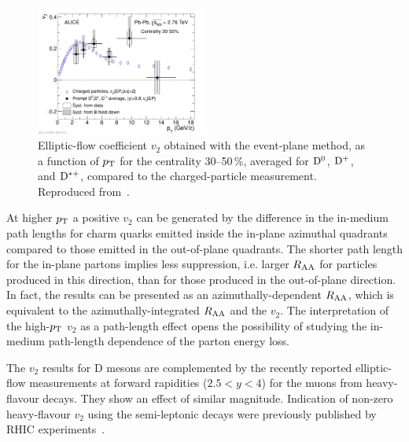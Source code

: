 \begin{figure}
\centering
\includegraphics[width=0.5\textwidth]{ksfigures/DmesonV2.pdf}
\caption{Elliptic-flow coefficient $v_2$ obtained with the event-plane method, as a function of $p_{\rm T}$ for the centrality 30--50\,\%, averaged for ${\rm D}^0$, ${\rm D}^+$, and ${\rm D}^{*+}$, compared to the charged-particle measurement. Reproduced from~\cite{Abelev:2013lca}.}
\label{figks:DmesonV2}
\end{figure}

At higher $p_{\rm T}$ a positive $v_2$ can be generated by the difference in the in-medium path lengths for charm quarks emitted inside the in-plane azimuthal quadrants compared to those emitted in the out-of-plane quadrants. The shorter path length for the in-plane partons implies less suppression, i.e. larger $R_{\rm AA}$ for particles produced in this direction, than for those produced in the out-of-plane direction. In fact, the results can be presented as an azimuthally-dependent $R_{\rm AA}$, which is equivalent to the azimuthally-integrated $R_{\rm AA}$ and the $v_2$. The interpretation of the high-$p_{\rm T}$ $v_2$ as a path-length effect opens the possibility of studying  the in-medium path-length dependence of the parton energy loss.

The $v_2$ results for D mesons are complemented by the recently reported elliptic-flow measurements at forward rapidities ($2.5 < y < 4$) for the muons from heavy-flavour decays. They show an effect of similar magnitude. Indication of non-zero heavy-flavour $v_2$ using the semi-leptonic decays were previously published by RHIC experiments~\cite{Adler:2005ab,Adare:2006nq}.
